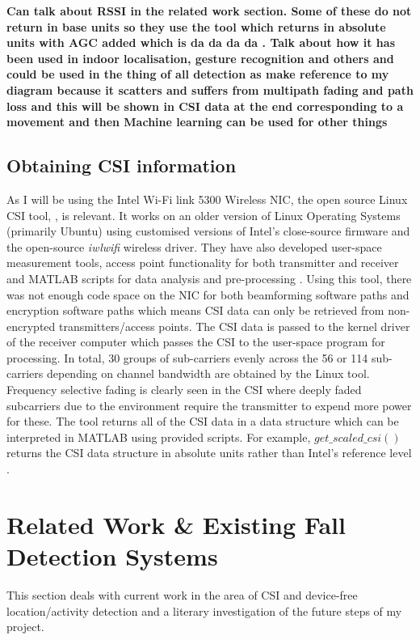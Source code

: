 \textbf{Can talk about RSSI in the related work section. Some of these do not return in base units so they use the tool which returns in absolute units with AGC added which is da da da da . Talk about how it has been used in indoor localisation, gesture recognition and others and could be used in the thing of all detection as make reference to my diagram because it scatters and suffers from multipath fading and path loss and this will be shown in CSI data at the end corresponding to a movement and then Machine learning can be used for other things}
\subsection{Obtaining CSI information}
As I will be using the Intel Wi-Fi link 5300 Wireless NIC, the open source Linux CSI tool, \cite{Halperin_csitool}, is relevant. It works on an older version of Linux Operating Systems (primarily Ubuntu) using customised versions of Intel's close-source firmware and the open-source \textit{iwlwifi} wireless driver. They have also developed user-space measurement tools, access point functionality for both transmitter and receiver and MATLAB scripts for data analysis and pre-processing \citep{Halperin_csitool}. Using this tool, there was not enough code space on the NIC for both beamforming software paths and encryption software paths which means CSI data can only be retrieved from non-encrypted transmitters/access points. The CSI data is passed to the kernel driver of the receiver computer which passes the CSI to the user-space program for processing. In total, 30 groups of sub-carriers evenly across the 56 or 114 sub-carriers depending on channel bandwidth are obtained by the Linux tool. Frequency selective fading is clearly seen in the CSI where deeply faded subcarriers due to the environment require the transmitter to expend more power for these. The tool returns all of the CSI data in a data structure which can be interpreted in MATLAB using provided scripts. For example, $get\_scaled\_csi()$ returns the CSI data structure in absolute units rather than Intel's reference level \citep{Halperin_csitool}. 

\section{Related Work \& Existing Fall Detection Systems}
This section deals with current work in the area of CSI and device-free location/activity detection and a literary investigation of the future steps of my project. 

